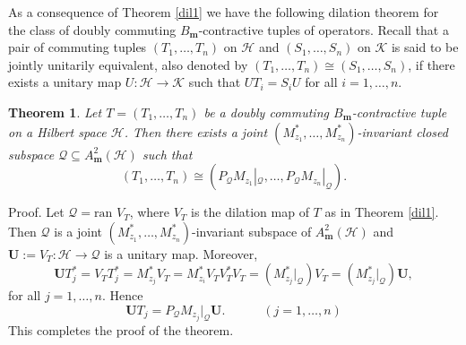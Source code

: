\documentclass[12pt]{amsart}
\newtheorem{Theorem}{\sc Theorem}[section]
\begin{document}
As a consequence of Theorem \ref{dil1} we have the following
dilation theorem for the class of doubly commuting
$B_{\bm{m}}$-contractive tuples of operators. Recall that a pair of
commuting tuples $(T_1, \ldots, T_n)$ on ${\mathcal{H}}$ and $(S_1, \ldots,
S_n)$ on ${\mathcal{K}}$ is said to be jointly unitarily equivalent, also
denoted by $(T_1, \ldots, T_n) \cong (S_1, \ldots, S_n)$, if there
exists a unitary map $U : {\mathcal{H}} {\rightarrow} {\mathcal{K}}$ such that $U T_i = S_i U$
for all $i = 1, \ldots, n$.

\begin{Theorem}\label{dil-H}
Let $T = (T_1, \ldots, T_n)$ be a doubly commuting
$B_{\bm{m}}$-contractive tuple on a Hilbert space ${\mathcal{H}}$. Then there
exists a joint $(M_{z_1}^*, \ldots, M_{z_n}^*)$-invariant closed
subspace ${\mathcal{Q}} \subseteq A^2_{\bm{m}}({\mathcal{H}})$ such that \[(T_1, \ldots,
T_n) \cong (P_{\mathcal{Q}} M_{z_1}|_{\mathcal{Q}}, \ldots, P_{\mathcal{Q}}
M_{z_n}|_{\mathcal{Q}}).\]
\end{Theorem}
{\noindent}\textsf{Proof.} Let ${\mathcal{Q}} = \mbox{ran~} V_T$, where $V_T$ is the
dilation map of $T$ as in Theorem \ref{dil1}. Then ${\mathcal{Q}}$ is a joint
$(M_{z_1}^*, \ldots, M_{z_n}^*)$-invariant subspace of
$A^2_{\bm{m}}({\mathcal{H}})$ and $\bm{U} := V_T : {\mathcal{H}} {\rightarrow} {\mathcal{Q}}$ is a unitary
map. Moreover, \[\bm{U} T_j^* = V_T T_j^* = M_{z_j}^* V_T =
M_{z_i}^* V_T V_T^* V_T = (M_{z_j}^*|_{\mathcal{Q}}) V_T =
(M_{z_j}^*|_{\mathcal{Q}}) \bm{U},\]for all $j = 1, \ldots, n$. Hence
\[\bm{U} T_j = P_{\mathcal{Q}} M_{z_j}|_{\mathcal{Q}} \bm{U}. \quad \quad \quad (j = 1, \ldots,
n)\]This completes the proof of the theorem. {\hfill \vrule height6pt width 6pt depth 0pt}
\end{document}

